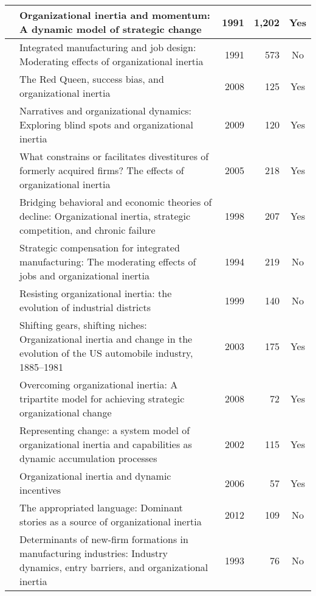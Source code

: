 \begin{longtable}{|c|>{\raggedright\arraybackslash}p{3.7cm}|r|r|c|}
    \cite{kelly1991organizational} & Organizational inertia and momentum: A dynamic model of strategic change & 1991 & 1,202 & Yes \\
	\hline 
    \cite{dean1991integrated}      & Integrated manufacturing and job design: Moderating effects of organizational inertia & 1991 & 573 & No \\
	\hline 
    \cite{barnett2008red} & The Red Queen, success bias, and organizational inertia & 2008 & 125 & Yes \\
	\hline 
    \cite{geiger2009narratives} & Narratives and organizational dynamics: Exploring blind spots and organizational inertia & 2009 & 120 & Yes \\
	\hline 
    \cite{shimizu2005constrains} & What constrains or facilitates divestitures of formerly acquired firms? The effects of organizational inertia & 2005 & 218 & Yes \\
	\hline 
    \cite{van1998bridging} & Bridging behavioral and economic theories of decline: Organizational inertia, strategic competition, and chronic failure & 1998 & 207 & Yes \\
	\hline 
    \cite{snell1994strategic} & Strategic compensation for integrated manufacturing: The moderating effects of jobs and organizational inertia & 1994 & 219 & No \\
	\hline 
    \cite{lazerson1999resisting} & Resisting organizational inertia: the evolution of industrial districts & 1999 & 140 & No \\
	\hline 
    \cite{dobrev2003shifting} & Shifting gears, shifting niches: Organizational inertia and change in the evolution of the US automobile industry, 1885--1981 & 2003 & 175 & Yes \\
	\hline 
    \cite{godkin2008overcoming} & Overcoming organizational inertia: A tripartite model for achieving strategic organizational change & 2008 & 72 & Yes \\
	\hline 
    \cite{larsen2002representing} & Representing change: a system model of organizational inertia and capabilities as dynamic accumulation processes & 2002 & 115 & Yes \\
	\hline 
    \cite{boyer2006organizational} & Organizational inertia and dynamic incentives & 2006 & 57 & Yes \\
	\hline 
    \cite{naslund2012appropriated} & The appropriated language: Dominant stories as a source of organizational inertia & 2012 & 109 & No \\
	\hline 
    \cite{dean1993determinants} & Determinants of new-firm formations in manufacturing industries: Industry dynamics, entry barriers, and organizational inertia & 1993 & 76 & No \\

\end{longtable}
